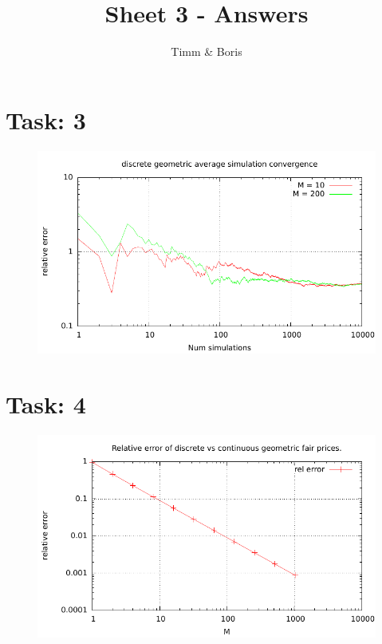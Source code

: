 \documentclass{article}
\title{Sheet 3 - Answers}
\author{Timm \& Boris}
\begin{document}
\maketitle



\section*{Task: 3}

% 
\begin{figure}[htbp]
  \centering
     \includegraphics[width=1.0\textwidth]{../Task03/sh3_task3_convergence_plot.pdf}
\end{figure}

\section*{Task: 4}
\begin{figure}[htbp]
  \centering
     \includegraphics[width=1.0\textwidth]{../Task04/sh3_task4_convergence_plot.pdf}
\end{figure}
\end{document}
